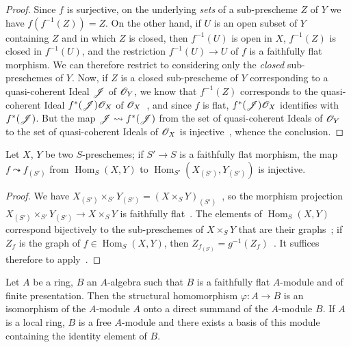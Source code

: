 \begin{proof}
Since $f$ is surjective, on the underlying \emph{sets} of a sub-prescheme $Z$ of $Y$ we have $f(f^{-1}(Z))=Z$.
On the other hand, if $U$ is an open subset of $Y$ containing $Z$ and in which $Z$ is closed, then $f^{-1}(U)$ is open in $X$, $f^{-1}(Z)$ is closed in $f^{-1}(U)$, and the restriction $f^{-1}(U)\to U$ of $f$ is a faithfully flat morphism.
We can therefore restrict to considering only the \emph{closed} sub-preschemes of $Y$.
Now, if $Z$ is a closed sub-prescheme of $Y$ corresponding to a quasi-coherent Ideal $\mathscr{J}$ of $\mathscr{O}_Y$, we know that $f^{-1}(Z)$ corresponds to the quasi-coherent Ideal $f^*(\mathscr{J})\mathscr{O}_X$ of $\mathscr{O}_X$~, and since $f$ is flat, $f^*(\mathscr{J})\mathscr{O}_X$ identifies with $f^*(\mathscr{J})$.
But the map $\mathscr{J}\leadsto f^*(\mathscr{J})$ from the set of quasi-coherent Ideals of $\mathscr{O}_Y$ to the set of quasi-coherent Ideals of $\mathscr{O}_X$ is injective~, whence the conclusion.
\end{proof}

\begin{corollary}[2.2.16]
\label{IV.2.2.16}
Let $X$, $Y$ be two $S$-preschemes; if $S'\to S$ is a faithfully flat morphism, the map $f\leadsto f_{(S')}$ from $\operatorname{Hom}_S(X,Y)$ to $\operatorname{Hom}_{S'}(X_{(S')},Y_{(S')})$ is injective.
\end{corollary}

\begin{proof}
We have $X_{(S')}\times_{S'}Y_{(S')}=(X\times_S Y)_{(S')}$~, so the morphism projection $X_{(S')}\times_{S'}Y_{(S')}\to X\times_S Y$ is faithfully flat~.
The elements of $\operatorname{Hom}_S(X,Y)$ correspond bijectively to the sub-preschemes of $X\times_S Y$ that are their graphs~; if $Z_f$ is the graph of $f\in\operatorname{Hom}_S(X,Y)$, then $Z_{f_{(S')}}=g^{-1}(Z_f)$~.
It suffices therefore to apply~.
\end{proof}

\begin{proposition}[2.2.17]
\label{IV.2.2.17}
Let $A$ be a ring, $B$ an $A$-algebra such that $B$ is a faithfully flat $A$-module and of finite presentation.
Then the structural homomorphism $\varphi:A\to B$ is an isomorphism of the $A$-module $A$ onto a direct summand of the $A$-module $B$.
If $A$ is a local ring, $B$ is a free $A$-module and there exists a basis of this module containing the identity element of $B$.
\end{proposition}

